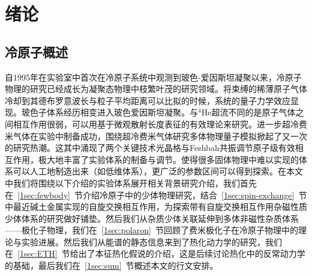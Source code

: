 \chapter{绪论}\label{chap:intro}



\section{冷原子概述}

自1995年在实验室中首次在冷原子系统中观测到玻色-爱因斯坦凝聚\cite{anderson1995observation,davis1995bose,Bradley1995evidence}以来，冷原子物理的研究已经成长为凝聚态物理中枝繁叶茂的研究领域。将束缚的稀薄原子气体冷却到其德布罗意波长与粒子平均距离可以比拟的时候，系统的量子力学效应显现。玻色子体系经历相变进入玻色爱因斯坦凝聚。与${}^4$He超流不同的是原子气体之间相互作用很弱，可以用基于微观散射长度表征的有效理论来研究\cite{Dalfovo1999theory,Fetter2009rotating,pethick2008bose,pitaevskii2003bose}。进一步超冷费米气体在实验中制备成功，围绕超冷费米气体研究多体物理量子模拟掀起了又一次的研究热潮\cite{Giorgini2008theory}。这其中涌现了两个关键技术光晶格\cite{Bloch2008many}与Feshbah共振调节原子级有效相互作用\cite{Chin2010feshbach}，极大地丰富了实验体系的制备与调节。使得很多固体物理中难以实现的体系可以人工地制造出来（如低维体系\cite{Cazalilla2011one,Guan2013fermi}），更广泛的参数区间可以得到探索。在本文中我们将围绕以下介绍的实验体系展开相关背景研究介绍，我们首先在~\ref{1sec:fewbody}~节介绍冷原子中的少体物理研究，结合~\ref{1sec:spin-exchange}~节中最近碱土金属实现的自旋交换相互作用，为探索带有自旋交换相互作用杂磁性质少体体系的研究做好铺垫。然后我们从杂质少体关联延伸到多体非磁性杂质体系——极化子物理，我们在~\ref{1sec:polaron}~节回顾了费米极化子在冷原子物理中的理论与实验进展。然后我们从能谱的静态信息来到了热化动力学的研究，我们在~\ref{1sec:ETH}~节给出了本征热化假说的介绍，这是后续讨论热化中的反常动力学的基础，最后我们在~\ref{1sec:sum}~节概述本文的行文安排。





